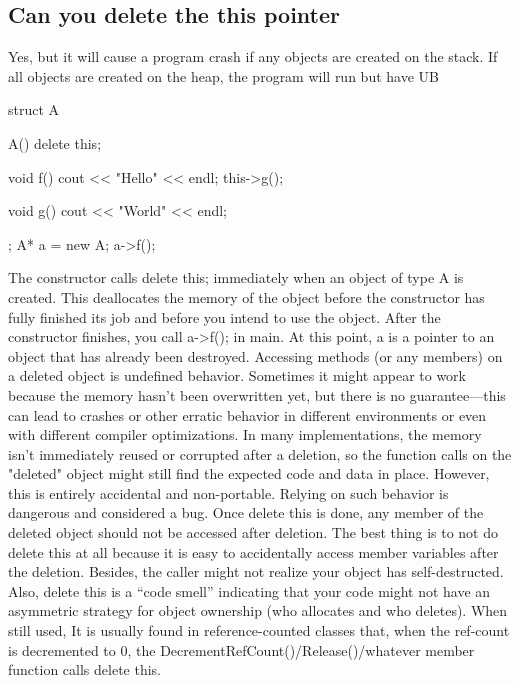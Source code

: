 \documentclass{report}
\begin{document}
    \subsection{Can you delete the this pointer}
    \bigbreak \noindent 
    Yes, but it will cause a program crash if any objects are created on the stack. If all objects are created on the heap, the program will run but have UB
    \bigbreak \noindent 
    \begin{cppcode}
        struct A {
            A() {
                delete this;
            }

            void f() {
                cout << "Hello" << endl;
                this->g();
            }

            void g() {
                cout << "World" << endl;
            }
        };
        A* a = new A;
        a->f();
    \end{cppcode}
    \bigbreak \noindent 
    The constructor calls delete this; immediately when an object of type A is created. This deallocates the memory of the object before the constructor has fully finished its job and before you intend to use the object.
    \bigbreak \noindent 
    After the constructor finishes, you call a->f(); in main. At this point, a is a pointer to an object that has already been destroyed. Accessing methods (or any members) on a deleted object is undefined behavior. Sometimes it might appear to work because the memory hasn’t been overwritten yet, but there is no guarantee—this can lead to crashes or other erratic behavior in different environments or even with different compiler optimizations.
    \bigbreak \noindent 
    In many implementations, the memory isn’t immediately reused or corrupted after a deletion, so the function calls on the "deleted" object might still find the expected code and data in place. However, this is entirely accidental and non-portable. Relying on such behavior is dangerous and considered a bug.
    \bigbreak \noindent 
    Once delete this is done, any member of the deleted object should not be accessed after deletion.
    \bigbreak \noindent 
    The best thing is to not do delete this at all because it is easy to
    accidentally access member variables after the deletion. Besides, the
    caller might not realize your object has self-destructed.
    \bigbreak \noindent 
    Also, delete this is a “code smell” indicating that your code
    might not have an asymmetric strategy for object ownership (who
    allocates and who deletes).
    \bigbreak \noindent 
    When still used, It is usually found in reference-counted classes
    that, when the ref-count is decremented to 0, the DecrementRefCount()/Release()/whatever member function calls delete this.
\end{document}
